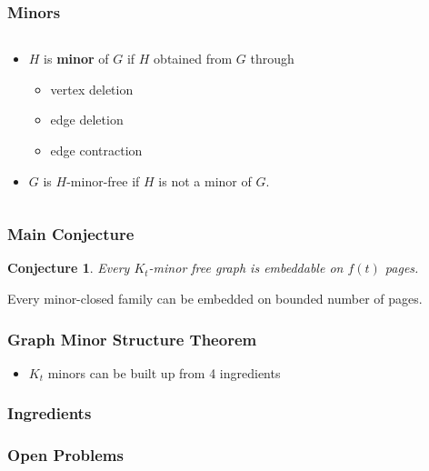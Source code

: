 \documentclass{beamer}
\newtheorem{conjecture}[theorem]{Conjecture}
\begin{document}
\begin{frame}
    \frametitle{Minors}
    \begin{columns}
      \begin{column}{0.5\textwidth}
          \begin{itemize}
            \item $H$ is \textbf{minor} of $G$ if $H$ obtained from $G$ through \begin{itemize}
              \item vertex deletion
              \item edge deletion
              \item edge contraction
            \end{itemize}
            \item $G$ is $H$-minor-free if $H$ is not a minor of $G$. 
          \end{itemize}    
      \end{column}
        \begin{column}{0.5\textwidth}
          \begin{figure}
            \centering
            
          \end{figure}
      \end{column}
    \end{columns}
\end{frame}

\begin{frame}
	\frametitle{Main Conjecture}
	\begin{conjecture}
		Every $K_t$-minor free graph is embeddable on $f(t)$ pages.
	\end{conjecture}
	
	\begin{corollary}
		Every minor-closed family can be embedded on bounded number of pages.
	\end{corollary}
\end{frame}

\begin{frame}
    \frametitle{Graph Minor Structure Theorem}
    \begin{itemize}
      \item $K_t$ minors can be built up from 4 ingredients
    \end{itemize}
\end{frame}

\begin{frame}
  \frametitle{Ingredients}
\end{frame}

\begin{frame}
  \frametitle{Open Problems}
\end{frame}
\end{document}
